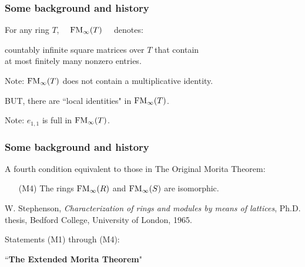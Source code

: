 \documentclass{beamer}
\begin{document}
\begin{frame}
\frametitle{Some background and history}

\noindent For any ring $T$,   \ \  ${\rm FM}_\infty(T)$ \ \  denotes:  

\medskip

\qquad  countably infinite square matrices over $T$  that contain \\ \qquad  at most finitely many nonzero entries.  
 
 \bigskip
 
 \pause
 
 Note:  ${\rm FM}_\infty(T)$ does not contain a multiplicative identity.  
 
 \medskip
 
  BUT, there are ``local identities" in ${\rm FM}_\infty(T)$.  
 
 \pause
 
 \bigskip
 
   Note:   $e_{1,1}$ is full in ${\rm FM}_\infty(T)$.   
 

\end{frame}



\begin{frame}
\frametitle{Some background and history}
 
 


 
 A fourth  condition  equivalent to those in The Original Morita Theorem:
 
 

     
 
\begin{itemize}
\item[(M4)]  The rings  ${\rm FM}_\infty(R)$ and ${\rm FM}_\infty(S)$ are isomorphic.        
\end{itemize}
     
     
     \medskip

 \footnotesize
     
 
W. Stephenson, \emph{Characterization of rings and modules by means of lattices}, Ph.D. thesis, Bedford College, University of London, 1965.
\normalsize
 \pause
 
 \bigskip



\smallskip



\noindent  Statements (M1) through (M4): 

\medskip

\qquad \qquad   ``{\bf The Extended Morita 
 Theorem}"


\end{frame}
\end{document}
